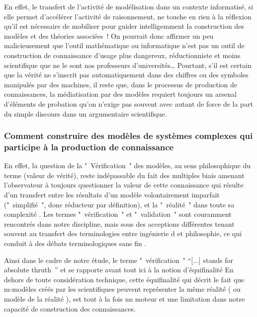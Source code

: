 En effet, le transfert de l'activité de modélisation dans un contexte informatisé, si elle permet  d'accélérer l'activité de raisonnement, ne touche en rien à la réflexion qu'il est nécessaire de mobiliser pour guider intelligemment la construction des modèles et des théories associées ! On pourrait donc affirmer un peu malicieusement que l'outil mathématique ou informatique n'est pas un outil de construction de connaissance d'usage plus dangereux, réductionniste et moins scientifique que ne le sont nos professeurs d'universités… Pourtant, s’il est certain que la vérité ne s’inscrit pas automatiquement dans des chiffres ou des symboles manipulés par des machines,  il reste que, dans le processus de production de connaissances, la médiatisation par des modèles requiert toujours un arsenal d’éléments de probation qu’on n’exige pas souvent avec autant de force de la part du simple discours dans un argumentaire scientifique.


\subsubsection{Comment construire des modèles de systèmes complexes qui participe à la production de connaissance}

En effet, la question de la " Vérification " des modèles, au sens philosophique du terme (valeur de vérité), reste indépassable du fait des multiples biais amenant l'observateur à toujours questionner la valeur de cette connaissance qui résulte d'un transfert entre les résultats d'un modèle volontairement imparfait (" simplifié ", donc réducteur par définition), et la " réalité " dans toute sa complexité  \autocite{OSullivan2004}.  Les termes " vérification " et  " validation " sont couramment rencontrés dans notre discipline, mais sous des acceptions différentes tenant souvent au transfert des terminologies entre ingénierie \autocite{Sargent1984} d\autocite{Balci1998}  et philosophie, ce qui conduit à  des débats terminologiques sans fin \autocite{David2009}. 

Ainsi dans le cadre de notre étude, le terme " vérification "  \enquote{[...] stands for absolute thruth } \autocite{David2009} \autocite{Oreskes1994} et se rapporte avant tout ici à la notion d'équifinalité \autocite{OSullivan2004} En dehors de toute considération technique, cette équifinalité qui décrit le fait que m-modèles créés par les scientifiques peuvent représenter la même réalité ( ou modèle de la réalité ), est tout à la fois un moteur et une limitation dans notre capacité de construction des connaissances. 

